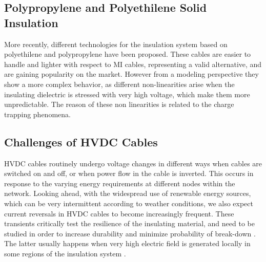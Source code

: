 \documentclass[11pt,a4paper]{article}
\begin{document}
\subsection{Polypropylene and Polyethilene Solid Insulation}
More recently, different technologies for the insulation system based on polyethilene and polypropylene have been proposed. These cables are easier to handle and lighter with respect to MI cables, representing a valid alternative, and are gaining popularity on the market. However from a modeling perspective they show a more complex behavior, as different non-linearities arise when the insulating dielectric is stressed with very high voltage, which make them more unpredictable. The reason of these non linearities is related to the charge trapping phenomena.
\subsection{Challenges of HVDC Cables}
HVDC cables routinely undergo voltage changes in different ways when cables are switched on and off, or when power flow in the cable is inverted. This occurs in response to the varying energy requirements at different nodes within the network. Looking ahead, with the widespread use of renewable energy sources, which can be very intermittent according to weather conditions, we also expect current reversals in HVDC cables to become increasingly frequent. These transients critically test the resilience of the insulating material, and need to be studied in order to increase durability and minimize probability of break-down \cite{hakonseththesis}. The latter usually happens when very high electric field is generated locally in some regions of the insulation system \cite{9474605}.
\end{document}
